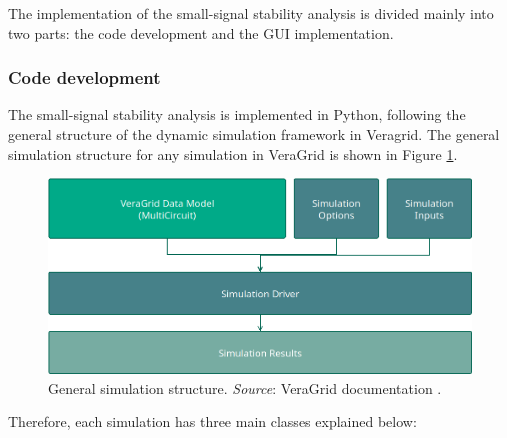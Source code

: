The implementation of the small-signal stability analysis is divided mainly into two parts: the code development
 and the GUI implementation. 

\subsubsection{Code development}

The small-signal stability analysis is implemented in Python, following the general structure of the 
dynamic simulation framework in Veragrid. The general simulation structure for any simulation in VeraGrid
 is shown in Figure \ref{fig:General_Simulation_Structure}. 

\begin{figure}[H]
  \centering
  \includegraphics[width=0.8\linewidth]{figures/DataModelSimulationStructure.png}
  \caption{General simulation structure. \textit{Source}: VeraGrid documentation \cite{veragrid}.}
  \label{fig:General_Simulation_Structure}
\end{figure}

Therefore, each simulation has three main classes explained below:

